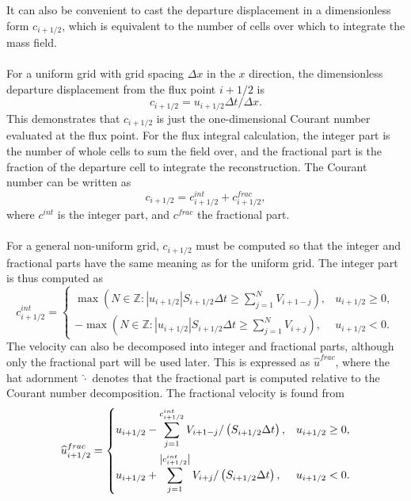 \documentclass{ametsocV6.1}
\begin{document}
It can also be convenient to cast the departure displacement in a dimensionless form $c_{i+1/2}$, which is equivalent to the number of cells over which to integrate the mass field. \\
\\
For a uniform grid with grid spacing $\Delta x$ in the $x$ direction, the dimensionless departure displacement from the flux point $i+1/2$ is
\begin{equation}
c_{i+1/2} = u_{i+1/2} \Delta{t} / \Delta{x}.
\end{equation}
This demonstrates that $c_{i+1/2}$ is just the one-dimensional Courant number evaluated at the flux point.
For the flux integral calculation, the integer part is the number of whole cells to sum the field over, and the fractional part is the fraction of the departure cell to integrate the reconstruction. The Courant number can be written as
\begin{equation}
c_{i+1/2} = c^{int}_{i+1/2} + c^{frac}_{i+1/2},
\end{equation}
where $c^{int}$ is the integer part, and $c^{frac}$ the fractional part. \\
\\
For a general non-uniform grid, $c_{i+1/2}$ must be computed so that the integer and fractional parts have the same meaning as for the uniform grid.
The integer part is thus computed as
\begin{equation} \label{eqn:int_courant}
c^{int}_{i+1/2} = 
\begin{cases}
\max\left(N\in\mathbb{Z} : |u_{i+1/2}| S_{i+1/2}\Delta t \geq\sum_{j=1}^N V_{i+1-j} \right), & u_{i+1/2} \geq 0, \\
-\max\left(N\in\mathbb{Z} : |u_{i+1/2}| S_{i+1/2} \Delta t \geq\sum_{j=1}^N V_{i+j} \right), & u_{i+1/2} < 0.
\end{cases}
\end{equation}
The velocity can also be decomposed into integer and fractional parts, although only the fractional part will be used later.
This is expressed as $\widehat{u}^{frac}$, where the hat adornment $\widehat{\cdot}$ denotes that the fractional part is computed relative to the Courant number decomposition.
The fractional velocity is found from
\begin{equation} \label{eqn:frac_wind}
\widehat{u}^{frac}_{i+1/2} = 
\begin{dcases}
u_{i+1/2}-\sum_{j=1}^{c^{int}_{i+1/2}} V_{i+1-j} / \left(S_{i+1/2}\Delta t\right), & u_{i+1/2} \geq 0, \\
u_{i+1/2}+\sum_{j=1}^{\left|c^{int}_{i+1/2}\right|} V_{i+j} / \left(S_{i+1/2}\Delta t\right), & u_{i+1/2} < 0.
\end{dcases}
\end{equation}
\end{document}
